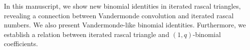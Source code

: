 In this manuscript, we show new binomial identities in iterated rascal triangles,
revealing a connection between Vandermonde convolution and iterated rascal numbers.
We also present Vandermonde-like binomial identities.
Furthermore, we establish a relation between iterated rascal triangle and $(1,q)$-binomial coefficients.
